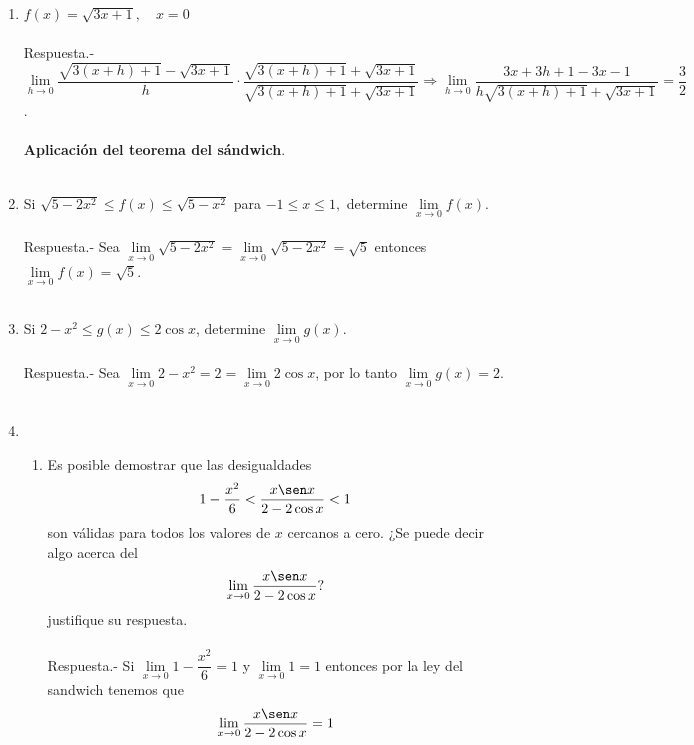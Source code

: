 \begin{enumerate}
\item $f(x) = \sqrt{3x+1}, \quad x=0$\\\\
    Respuesta.-\; $\lim\limits_{h\to 0} \dfrac{\sqrt{3(x+h)+1}-\sqrt{3x+1}}{h} \cdot \dfrac{\sqrt{3(x+h)+1}+\sqrt{3x+1}}{\sqrt{3(x+h)+1}+\sqrt{3x+1}} \Longrightarrow \lim\limits_{h\to 0}\dfrac{3x+3h + 1 - 3x - 1}{h\sqrt{3(x+h)+1}+\sqrt{3x+1}} = \dfrac{3}{2}$.\\\\ 

\textbf{Aplicación del teorema del sándwich}.\\\\

\item Si $\sqrt{5-2x^2}\leq f(x)\leq \sqrt{5-x^2}$ para $-1\leq x \leq 1,$ determine $\lim\limits_{x\to 0}f(x).$\\\\
    Respuesta.-\; Sea $\lim\limits_{x\to 0}\sqrt{5-2x^2}=\lim\limits_{x\to 0}\sqrt{5-2x^2}=\sqrt{5}$ entonces $\lim\limits_{x\to 0}f(x) = \sqrt{5}$.\\\\

\item Si $2-x^2\leq g(x)\leq 2\cos x$, determine $\lim\limits_{x\to 0}g(x)$.\\\\
    Respuesta.-\; Sea $\lim\limits_{x\to 0}2-x^2 = 2 = \lim\limits_{x\to 0}2\cos x$, por lo tanto $\lim\limits_{x\to 0}g(x) = 2$.\\\\

\item 
\begin{enumerate}[\bfseries a)]

    \item Es posible demostrar que las desigualdades $$1-\dfrac{x^2}{6}<\dfrac{x\sen x}{2-2\cos x}<1$$
	son válidas para todos los valores de $x$ cercanos a cero. ¿Se puede decir algo acerca del $$\lim_{x\to 0}\dfrac{x\sen x}{2-2\cos x}?$$
    justifique su respuesta.\\\\
	Respuesta.-\; Si $\lim\limits_{x\to 0}1-\dfrac{x^2}{6} = 1$ y $\lim\limits_{x\to 0}1=1$ entonces por la ley del sandwich tenemos que 
	$$\lim_{x\to 0}\dfrac{x\sen x}{2-2\cos x} = 1$$\\


\end{enumerate}
\end{enumerate}
